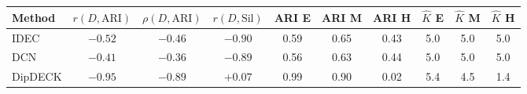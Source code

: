 \begin{tabular}{@{}lccccccccc@{}}
\toprule
Method & $r(D,\text{ARI})$ & $\rho(D,\text{ARI})$ & $r(D,\text{Sil})$ & ARI E & ARI M & ARI H & $\hat K$ E & $\hat K$ M & $\hat K$ H \\
\midrule
IDEC & $-0.52$ & $-0.46$ & $-0.90$ & 0.59 & 0.65 & 0.43 & 5.0 & 5.0 & 5.0 \\
DCN & $-0.41$ & $-0.36$ & $-0.89$ & 0.56 & 0.63 & 0.44 & 5.0 & 5.0 & 5.0 \\
DipDECK & $-0.95$ & $-0.89$ & $+0.07$ & 0.99 & 0.90 & 0.02 & 5.4 & 4.5 & 1.4 \\
\bottomrule
\end{tabular}
